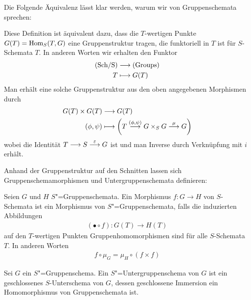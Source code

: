 \documentclass[german, bibliography=totoc]{scrreprt}
\renewcommand*{\optcite}[2][]{}
\begin{document}
Die Folgende Äquivalenz lässt klar werden, warum wir von
Gruppenschemata sprechen:
\begin{Bemerkung}
  Diese Definition ist äquivalent dazu, dass die $T$-wertigen Punkte
  $G(T)=\operatorname{Hom}_S(T,G)$ eine Gruppenstruktur tragen, die funktoriell in
  $T$ ist für $S$-Schemata $T$.\optcite[Chapter (4.15)]{wedhorn}
  In anderen Worten wir erhalten den Funktor 
  \begin{align*}
    \text{(Sch/S)} &\longrightarrow \text{(Groups)}\\
    T &\longmapsto G(T)
  \end{align*}
  Man erhält eine solche Gruppenstruktur aus den oben angegebenen
  Morphismen durch
  \begin{align*}
    G(T)\times G(T) &\longrightarrow G(T)\\
    (\phi, \psi) &\longmapsto 
                   \left(
                   T\overset{(\phi,\psi)}{\longrightarrow} G\times_S G
                   \overset\mu{\longrightarrow} G
                   \right)
  \end{align*}
  wobei die Identität $T\longrightarrow S\overset{\varepsilon}{\longrightarrow} G$ ist und
  man Inverse durch Verknüpfung mit $i$ erhält.
  \optcite[Proposition IV.3.2]{silverman2}
\end{Bemerkung}

Anhand der Gruppenstruktur auf den Schnitten lassen sich
Gruppenschemamorphismen und Untergruppenschemata definieren:
\begin{Definition}
  \optcite[Definition 4.42]{wedhorn}
  Seien $G$ und $H$ $S$"=Gruppenschemata.
  Ein Morphismus $f\colon G\to H$ von $S$-Schemata ist ein Morphismus
  von $S$"=Gruppenschemata, falls die induzierten Abbildungen
  \begin{gather*}
    (\bullet\circ f)\colon G(T)\to H(T)
  \end{gather*}auf den $T$-wertigen Punkten
  Gruppenhomomorphismen sind für alle $S$-Schemata $T$.
  In anderen Worten
  \begin{gather*}
    f\circ\mu_G = \mu_H\circ(f\times f)
  \end{gather*}
\end{Definition}

\begin{Definition}[Untergruppenschema]
  \optcite[Definition 4.45]{wedhorn}
  Sei $G$ ein $S$"=Gruppenschema.
  Ein $S$"=Untergruppenschema von $G$ ist ein geschlossenes
  $S$-Unterschema von $G$, dessen geschlossene Immersion ein
  Homomorphismus von Gruppenschemata ist.
\end{Definition}
\end{document}
